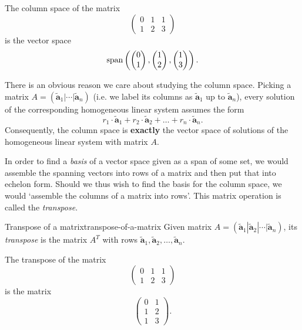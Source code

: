 \begin{example}{}{}
 The column space of the matrix
 \[
  \begin{pmatrix}
   0 & 1 & 1\\
   1 & 2 & 3
  \end{pmatrix}
 \]
 is the vector space
 \[
  \operatorname{span} \left( 
   \begin{pmatrix}
    0\\
    1
   \end{pmatrix},
   \begin{pmatrix}
    1\\
    2
   \end{pmatrix},
   \begin{pmatrix}
    1\\
    3
   \end{pmatrix}
  \right).
 \]
\end{example}

There is an obvious reason we care about studying the column space. Picking a
matrix $A = (\tilde{\mathbf{a}}_1 | \cdots | \tilde{\mathbf{a}}_n)$ (i.e. we
label its columns as $\tilde{\mathbf{a}}_1$ up to $\tilde{\mathbf{a}}_n$),
every solution of the corresponding homogeneous linear system assumes the form
\[
 r_1 \cdot \tilde{\mathbf{a}}_1 + r_2 \cdot \tilde{\mathbf{a}}_2 + \ldots +
 r_n \cdot \tilde{\mathbf{a}}_n.
\]
Consequently, the column space is \textbf{exactly} the vector space of
solutions of the homogeneous linear system with matrix $A$.

In order to find a \emph{basis} of a vector space given as a span of some set,
we would assemble the spanning vectors into rows of a matrix and then put that
into echelon form. Should we thus wish to find the basis for the column space,
we would `assemble the columns of a matrix into rows'. This matrix operation is
called the \emph{transpose}.

\begin{definition}{Transpose of a matrix}{transpose-of-a-matrix}
 Given matrix $A = (\tilde{\mathbf{a}}_1 | \tilde{\mathbf{a}}_2 | \cdots |
 \tilde{\mathbf{a}}_n)$, its \emph{transpose} is the matrix $A^{T}$ with rows
 $\tilde{\mathbf{a}}_1,\tilde{\mathbf{a}}_2,\ldots,\tilde{\mathbf{a}}_n$.
\end{definition}

\begin{example}{}{}
 The transpose of the matrix
 \[
  \begin{pmatrix}
   0 & 1 & 1\\
   1 & 2 & 3
  \end{pmatrix}
 \]
 is the matrix
 \[
  \begin{pmatrix}
   0 & 1\\
   1 & 2\\
   1 & 3
  \end{pmatrix}.
 \]
\end{example}

